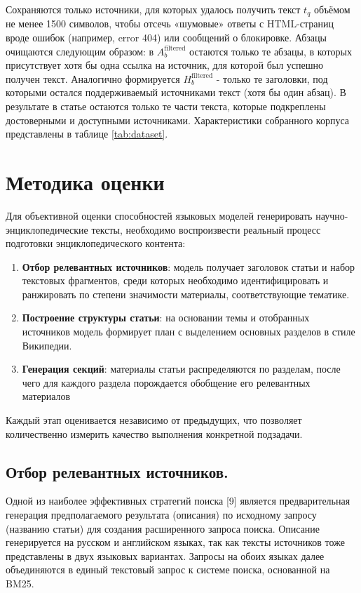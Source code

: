 \documentclass{article}
\begin{document}
Сохраняются только источники, для которых удалось получить текст \(t_q\) объёмом не менее 1500 символов,
чтобы отсечь «шумовые» ответы с HTML-страниц вроде ошибок (например, error 404) или сообщений о блокировке. 
Абзацы очищаются следующим образом: в \(A_b^{\mathrm{filtered}}\) остаются только те абзацы, в которых присутствует хотя бы одна ссылка на источник, для которой был успешно получен текст.
Аналогично формируется \(H_b^{\mathrm{filtered}}\) - только те заголовки, под которыми остался поддерживаемый источниками текст (хотя бы один абзац).
В результате в статье остаются только те части текста,
которые подкреплены достоверными и доступными источниками. Характеристики собранного корпуса представлены в таблице \ref{tab:dataset}.

\section*{Методика оценки}

Для объективной оценки способностей языковых моделей генерировать научно-энциклопедические тексты, необходимо воспроизвести реальный процесс подготовки энциклопедического контента:
\begin{enumerate}

    \item \textbf{Отбор релевантных источников}: модель получает заголовок статьи и набор текстовых фрагментов, среди которых необходимо идентифицировать и ранжировать по степени значимости материалы, соответствующие тематике. 
    
    \item \textbf{Построение структуры статьи}: на основании темы и отобранных источников модель формирует план с выделением основных разделов в стиле Википедии.
    
    \item \textbf{Генерация секций}: материалы статьи распределяются по разделам, после чего для каждого раздела порождается обобщение его релевантных материалов

\end{enumerate}
Каждый этап оценивается независимо от предыдущих, что позволяет количественно измерить качество выполнения конкретной подзадачи. 
\subsection*{Отбор релевантных источников.}
Одной из наиболее эффективных стратегий поиска [9] является предварительная генерация предполагаемого результата (описания) по исходному запросу (названию статьи) для создания расширенного запроса поиска.
Описание генерируется на русском и английском языках, так как тексты источников тоже представлены в двух языковых вариантах. 
Запросы на обоих языках далее объединяются в единый текстовый запрос к системе поиска, основанной на BM25. 
\end{document}
